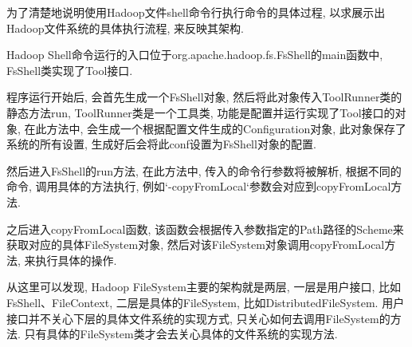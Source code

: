 为了清楚地说明使用Hadoop文件shell命令行执行命令的具体过程,
以求展示出Hadoop文件系统的具体执行流程, 来反映其架构.

Hadoop Shell命令运行的入口位于org.apache.hadoop.fs.FsShell的main函数中,
FsShell类实现了Tool接口.


程序运行开始后, 会首先生成一个FsShell对象, 然后将此对象传入ToolRunner类的静态方法run,
ToolRunner类是一个工具类, 功能是配置并运行实现了Tool接口的对象, 在此方法中,
会生成一个根据配置文件生成的Configuration对象, 此对象保存了系统的所有设置,
生成好后会将此conf设置为FsShell对象的配置.


然后进入FsShell的run方法, 在此方法中, 传入的命令行参数将被解析, 根据不同的命令,
调用具体的方法执行, 例如`-copyFromLocal`参数会对应到copyFromLocal方法.



之后进入copyFromLocal函数,
该函数会根据传入参数指定的Path路径的Scheme来获取对应的具体FileSystem对象,
然后对该FileSystem对象调用copyFromLocal方法, 来执行具体的操作.


从这里可以发现, Hadoop FileSystem主要的架构就是两层, 一层是用户接口,
比如FsShell、FileContext, 二层是具体的FileSystem, 比如DistributedFileSystem.
用户接口并不关心下层的具体文件系统的实现方式, 只关心如何去调用FileSystem的方法.
只有具体的FileSystem类才会去关心具体的文件系统的实现方法.
